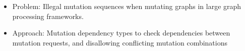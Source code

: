 \begin{frame}
\begin{itemize}
  \item Problem: Illegal mutation sequences when mutating graphs in large graph
  processing frameworks.
  \item Approach: Mutation dependency types to check dependencies between
  mutation requests, and disallowing conflicting mutation combinations
\end{itemize}

\end{frame}